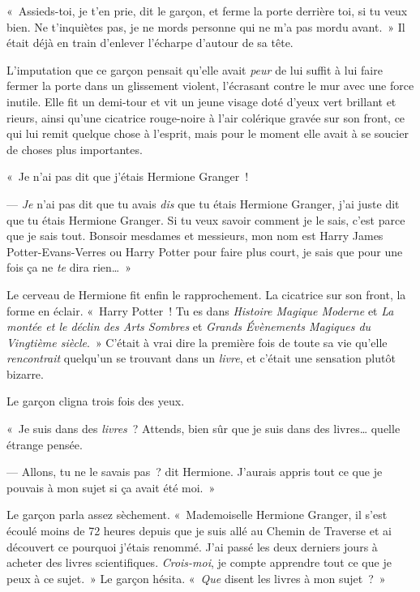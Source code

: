 «~Assieds-toi, je t'en prie, dit le garçon, et ferme la porte derrière toi, si tu veux bien.
Ne t'inquiètes pas, je ne mords personne qui ne m'a pas mordu avant.~»
Il était déjà en train d'enlever l'écharpe d'autour de sa tête.


L'imputation que ce garçon pensait qu'elle avait \emph{peur} de lui suffit à lui faire fermer la porte dans un glissement violent, l'écrasant contre le mur avec une force inutile. Elle fit un demi-tour et vit un jeune visage doté d'yeux vert brillant et rieurs, ainsi qu'une cicatrice rouge-noire à l'air colérique gravée sur son front, ce qui lui remit quelque chose à l'esprit, mais pour le moment elle avait à se soucier de choses plus importantes.

«~Je n'ai pas dit que j'étais Hermione Granger~!

--- \emph{Je} n'ai pas dit que tu avais \emph{dis} que tu étais Hermione Granger, j'ai juste dit que tu étais Hermione Granger. Si tu veux savoir comment je le sais, c'est parce que je sais tout. Bonsoir mesdames et messieurs, mon nom est Harry James Potter-Evans-Verres ou Harry Potter pour faire plus court, je sais que pour une fois ça ne \emph{te} dira rien…~»

Le cerveau de Hermione fit enfin le rapprochement. La cicatrice sur son front, la forme en éclair. «~Harry Potter~! Tu es dans \emph{Histoire Magique Moderne} et \emph{La montée et le déclin des Arts Sombres} et \emph{Grands Évènements Magiques du Vingtième siècle}.~» C'était à vrai dire la première fois de toute sa vie qu'elle \emph{rencontrait} quelqu'un se trouvant dans un \emph{livre}, et c'était une sensation plutôt bizarre.

Le garçon cligna trois fois des yeux.

«~Je suis dans des \emph{livres}~? Attends, bien sûr que je suis dans des livres… quelle étrange pensée.

--- Allons, tu ne le savais pas~? dit Hermione. J'aurais appris tout ce que je pouvais à mon sujet si ça avait été moi.~»

Le garçon parla assez sèchement. «~Mademoiselle Hermione Granger, il s'est écoulé moins de 72 heures depuis que je suis allé au Chemin de Traverse et ai découvert ce pourquoi j'étais renommé. J'ai passé les deux derniers jours à acheter des livres scientifiques. \emph{Crois-moi}, je compte apprendre tout ce que je peux à ce sujet.~» Le garçon hésita. «~\emph{Que} disent les livres à mon sujet~?~»

